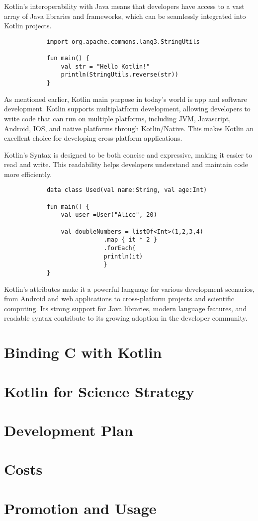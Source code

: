 \documentclass[10pt,twocolumn, a4paper]{article}
\begin{document}
Kotlin's interoperability with Java means that developers have access to a vast array of Java libraries and frameworks, which can be seamlessly integrated into Kotlin projects.

\begin{lstlisting}
			import org.apache.commons.lang3.StringUtils

			fun main() {
				val str = "Hello Kotlin!"
				println(StringUtils.reverse(str))
			}
		\end{lstlisting}

As mentioned earlier, Kotlin main purpose in today's world is app and software development. Kotlin supports multiplatform development, allowing developers to write code that can run on multiple platforms, including JVM, Javascript, Android, IOS, and native platforms through Kotlin/Native. This makes Kotlin an excellent choice for developing cross-platform applications.

Kotlin's Syntax is designed to be both concise and expressive, making it easier to read and write. This readability helps developers understand and maintain code more efficiently.

\begin{lstlisting}
			data class Used(val name:String, val age:Int)

			fun main() {
				val user =User("Alice", 20)
			
				val doubleNumbers = listOf<Int>(1,2,3,4)
							.map { it * 2 }
							.forEach{
							println(it)
							}
			}
		\end{lstlisting}

Kotlin's attributes make it a powerful language for various development scenarios, from Android and web applications to cross-platform projects and scientific computing. Its strong support for Java libraries, modern language features, and readable syntax contribute to its growing adoption in the developer community.


\section{Binding C with Kotlin}

\section{Kotlin for Science Strategy}
\section{Development Plan}
\section{Costs}
\section{Promotion and Usage}
\end{document}
